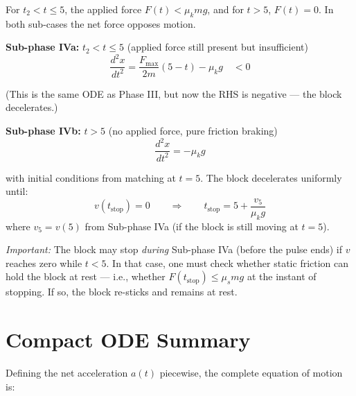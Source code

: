 \documentclass[11pt]{article}
\newcommand{\ddd}[2]{\frac{d^2 #1}{d #2^2}}
\begin{document}
For $t_2 < t \le 5$, the applied force $F(t) < \mu_k mg$, and for $t > 5$, $F(t) = 0$.  In both sub-cases the net force opposes motion.

\medskip
\noindent
\textbf{Sub-phase IVa:} $t_2 < t \le 5$ \quad(applied force still present but insufficient)
\begin{equation}
\ddd{x}{t} = \frac{F_{\max}}{2m}(5-t) - \mu_k g \quad < 0
\label{eq:phase4a}
\end{equation}

\noindent
(This is the same ODE as Phase III, but now the RHS is negative --- the block decelerates.)

\medskip
\noindent
\textbf{Sub-phase IVb:} $t > 5$ \quad(no applied force, pure friction braking)
\begin{equation}
\boxed{\ddd{x}{t} = -\mu_k g}
\label{eq:phase4b}
\end{equation}

\noindent
with initial conditions from matching at $t = 5$.  The block decelerates uniformly until:
\begin{equation}
v(t_{\text{stop}}) = 0
\qquad\Longrightarrow\qquad
t_{\text{stop}} = 5 + \frac{v_5}{\mu_k g}
\label{eq:tstop}
\end{equation}
where $v_5 = v(5)$ from Sub-phase IVa (if the block is still moving at $t = 5$).

\medskip
\noindent
\textit{Important:} The block may stop \emph{during} Sub-phase IVa (before the pulse ends) if $v$ reaches zero while $t < 5$.  In that case, one must check whether static friction can hold the block at rest --- i.e., whether $F(t_{\text{stop}}) \le \mu_s mg$ at the instant of stopping.  If so, the block re-sticks and remains at rest.

\section{Compact ODE Summary}

Defining the net acceleration $a(t)$ piecewise, the complete equation of motion is:
\end{document}
